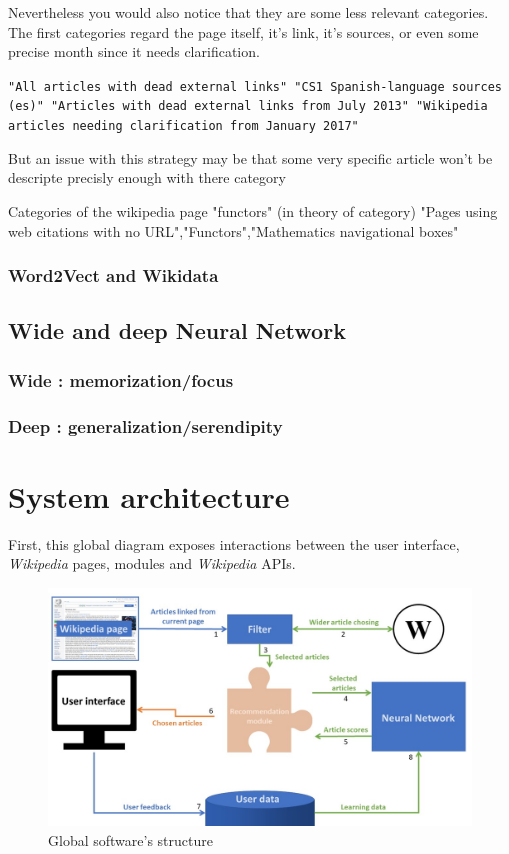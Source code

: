 \documentclass[11pt]{article}
\theoremstyle{plain}
\theoremstyle{definition}
\theoremstyle{remark}
\begin{document}
Nevertheless you would also notice that they are some less relevant categories. The first categories regard the page itself, it's link, it's sources, or even some precise month since it needs clarification.

 \begin{center}
	\texttt{"All articles with dead external links" "CS1 Spanish-language sources (es)" "Articles with dead external links from July 2013" "Wikipedia articles needing clarification from January 2017"}
 \end{center}
But an issue with this strategy may be that some very specific article won't be descripte precisly enough with there category 


Categories of the wikipedia page "functors" (in theory of category)
"Pages using web citations with no URL","Functors","Mathematics navigational boxes"

\subsubsection{Word2Vect and Wikidata}

\subsection{Wide and deep Neural Network}
\subsubsection{Wide : memorization/focus}
\subsubsection{Deep : generalization/serendipity}
 

\newpage

\section{System architecture}

First, this global diagram exposes interactions between the user interface, \textit{Wikipedia} pages, modules and \textit{Wikipedia} APIs. 

\begin{figure}[h!]
	\centering
    \includegraphics[width=400pt]{diagram.png}
    \caption{Global software's structure}
    \label{arch_glo}
\end{figure}
\end{document}
